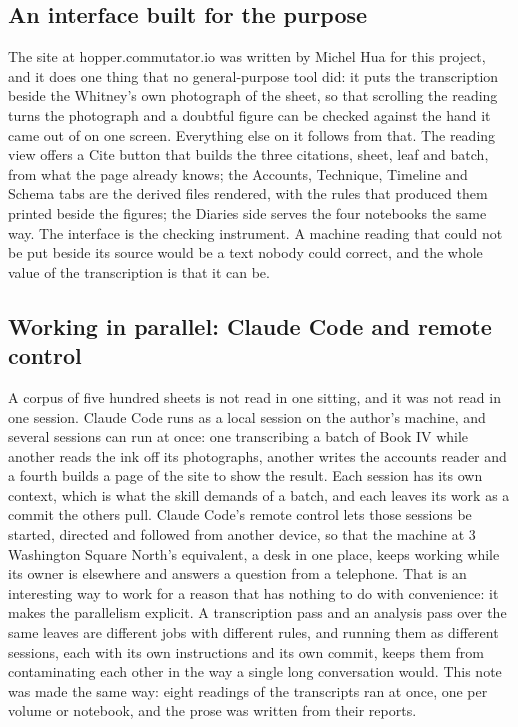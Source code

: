 \subsection*{An interface built for the purpose}

The site at hopper.commutator.io was written by Michel Hua for this project, and it does one thing that no general-purpose tool did: it puts the transcription beside the Whitney's own photograph of the sheet, so that scrolling the reading turns the photograph and a doubtful figure can be checked against the hand it came out of on one screen. Everything else on it follows from that. The reading view offers a Cite button that builds the three citations, sheet, leaf and batch, from what the page already knows; the Accounts, Technique, Timeline and Schema tabs are the derived files rendered, with the rules that produced them printed beside the figures; the Diaries side serves the four notebooks the same way. The interface is the checking instrument. A machine reading that could not be put beside its source would be a text nobody could correct, and the whole value of the transcription is that it can be.

\subsection*{Working in parallel: Claude Code and remote control}

A corpus of five hundred sheets is not read in one sitting, and it was not read in one session. Claude Code runs as a local session on the author's machine, and several sessions can run at once: one transcribing a batch of Book IV while another reads the ink off its photographs, another writes the accounts reader and a fourth builds a page of the site to show the result. Each session has its own context, which is what the skill demands of a batch, and each leaves its work as a commit the others pull. Claude Code's remote control lets those sessions be started, directed and followed from another device, so that the machine at 3 Washington Square North's equivalent, a desk in one place, keeps working while its owner is elsewhere and answers a question from a telephone. That is an interesting way to work for a reason that has nothing to do with convenience: it makes the parallelism explicit. A transcription pass and an analysis pass over the same leaves are different jobs with different rules, and running them as different sessions, each with its own instructions and its own commit, keeps them from contaminating each other in the way a single long conversation would. This note was made the same way: eight readings of the transcripts ran at once, one per volume or notebook, and the prose was written from their reports.

